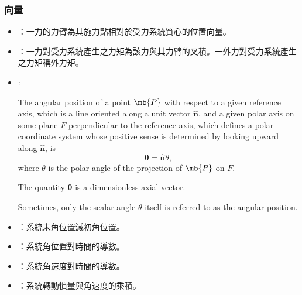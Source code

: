 \documentclass[a4paper,12pt]{article}
\begin{document}
\subsubsection{向量}
\begin{itemize}
\item{}：一力的力臂為其施力點相對於受力系統質心的位置向量。
\item{}：一力對受力系統產生之力矩為該力與其力臂的叉積。一外力對受力系統產生之力矩稱外力矩。
\item{}:

The angular position of a point $\mb{P}$ with respect to a given reference axis, which is a line oriented along a unit vector $\hat{\mathbf{n}}$, and a given polar axis on some plane $F$ perpendicular to the reference axis, which defines a polar coordinate system whose positive sense is determined by looking upward along $\hat{\mathbf{n}}$, is
\[\boldsymbol{\theta} = \hat{\mathbf{n}}\theta,\]
where $\theta$ is the polar angle of the projection of $\mb{P}$ on $F$.

The quantity $\boldsymbol{\theta}$ is a dimensionless axial vector.

Sometimes, only the scalar angle $\theta$ itself is referred to as the angular position.
\item{}：系統末角位置減初角位置。
\item{}：系統角位置對時間的導數。
\item{}：系統角速度對時間的導數。
\item{}：系統轉動慣量與角速度的乘積。
\end{itemize}
\end{document}
